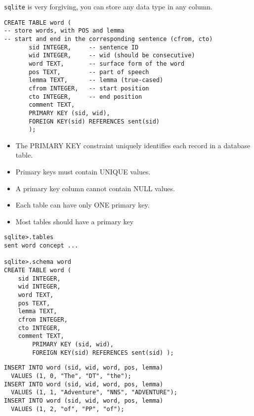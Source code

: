 \documentclass[a4paper,landscape,headrule,footrule,xetex]{foils}
\begin{document}
\texttt{sqlite} is very forgiving, you can store any data type in any column. 


\begin{verbatim}
CREATE TABLE word (
-- store words, with POS and lemma
-- start and end in the corresponding sentence (cfrom, cto)
       sid INTEGER,     -- sentence ID
       wid INTEGER,     -- wid (should be consecutive)
       word TEXT,       -- surface form of the word
       pos TEXT,        -- part of speech
       lemma TEXT,      -- lemma (true-cased)
       cfrom INTEGER,   -- start position 
       cto INTEGER,     -- end position  
       comment TEXT,
       PRIMARY KEY (sid, wid),
       FOREIGN KEY(sid) REFERENCES sent(sid)
       );
\end{verbatim}
\begin{itemize}
\item The PRIMARY KEY constraint uniquely identifies each record in a database table.
\item Primary keys must contain UNIQUE values.
\item A primary key column cannot contain NULL values.
\item Each table can have only ONE primary key.
\item Most tables should have a primary key
\end{itemize}


\begin{verbatim}
sqlite>.tables
sent word concept ...

sqlite>.schema word
CREATE TABLE word (
	sid INTEGER,
	wid INTEGER,
	word TEXT,
	pos TEXT,
	lemma TEXT,
	cfrom INTEGER,
	cto INTEGER,
	comment TEXT,
        PRIMARY KEY (sid, wid),
        FOREIGN KEY(sid) REFERENCES sent(sid) );
\end{verbatim}


\begin{verbatim}
INSERT INTO word (sid, wid, word, pos, lemma)  
  VALUES (1, 0, "The", "DT", "the");
INSERT INTO word (sid, wid, word, pos, lemma)  
  VALUES (1, 1, "Adventure", "NNS", "ADVENTURE");
INSERT INTO word (sid, wid, word, pos, lemma)  
  VALUES (1, 2, "of", "PP", "of");
\end{verbatim}
\end{document}
